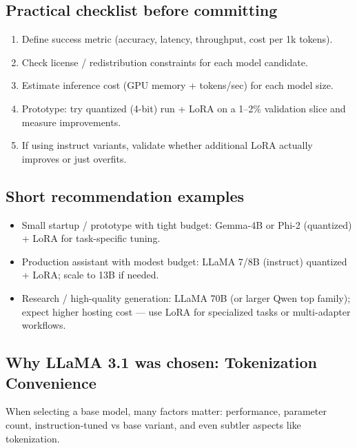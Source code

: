 \documentclass[a4paper, 12pt]{article}
\begin{document}
\subsection*{Practical checklist before committing}
\begin{enumerate}
  \item Define success metric (accuracy, latency, throughput, cost per 1k tokens).
  \item Check license / redistribution constraints for each model candidate.
  \item Estimate inference cost (GPU memory + tokens/sec) for each model size.
  \item Prototype: try quantized (4-bit) run + LoRA on a 1–2\% validation slice and measure improvements.
  \item If using instruct variants, validate whether additional LoRA actually improves or just overfits.
\end{enumerate}

\subsection*{Short recommendation examples}
\begin{itemize}
  \item Small startup / prototype with tight budget: Gemma-4B or Phi-2 (quantized) + LoRA for task-specific tuning.
  \item Production assistant with modest budget: LLaMA 7/8B (instruct) quantized + LoRA; scale to 13B if needed.
  \item Research / high-quality generation: LLaMA 70B (or larger Qwen top family); expect higher hosting cost — use LoRA for specialized tasks or multi-adapter workflows.
\end{itemize}

\newpage
\subsection*{Why LLaMA 3.1 was chosen: Tokenization Convenience}

When selecting a base model, many factors matter: performance, parameter count, instruction-tuned vs base variant, and even subtler aspects like tokenization.  
\end{document}
